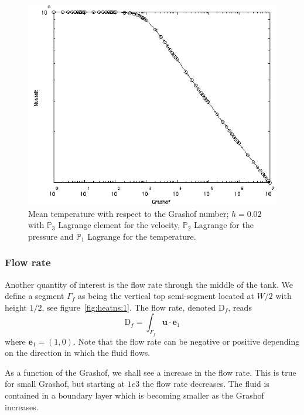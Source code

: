 \begin{figure}[htbp]
  \centering
  \includegraphics[width=.8\linewidth]{pngs/temp_grashof}
  \caption{Mean temperature with respect to the Grashof number;
    $h=0.02$ with $\mathbb{P}_3$ Lagrange element for the velocity,
    $\mathbb{P}_2$ Lagrange for the pressure and $\mathbb{P}_1$
    Lagrange for the temperature.}
  \label{fig:heatns:3}
\end{figure}

\subsubsection{Flow rate}
\label{sec:flow-rate}

Another quantity of interest is the flow rate through the middle of the
tank. We define a segment $\Gamma_f$ as being the vertical top
semi-segment located at $W/2$ with height $1/2$, see
figure~\ref{fig:heatns:1}. The flow rate, denoted $\mathrm{D}_f$, reads
\begin{equation}
  \label{eq:17}
  \mathrm{D}_f =  \int_{\Gamma_f} \mathbf{u} \cdot \mathbf{e}_1
\end{equation}
where $\mathbf{e}_1=(1,0)$. Note that the flow rate can be negative or
positive depending on the direction in which the fluid flows.

As a function of the Grashof, we shall see a increase in the flow
rate. This is true for small Grashof, but starting at $1e3$ the flow
rate decreases. The fluid is contained in a boundary layer which is
becoming smaller as the Grashof increases.

